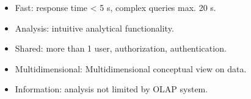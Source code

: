 
\begin{breakbox}
\begin{itemize}
	\item \textcolor{Emerald}{F}ast: response time < 5 s, complex queries max. 20 s.
	\item \textcolor{Emerald}{A}nalysis: intuitive analytical functionality.
	\item \textcolor{Emerald}{S}hared: more than 1 user, authorization, authentication.
	\item \textcolor {Emerald}{M}ultidimensional: Multidimensional conceptual view on data.
	\item \textcolor{Emerald}{I}nformation: analysis not limited by OLAP system.
\end{itemize}
\end{breakbox}

